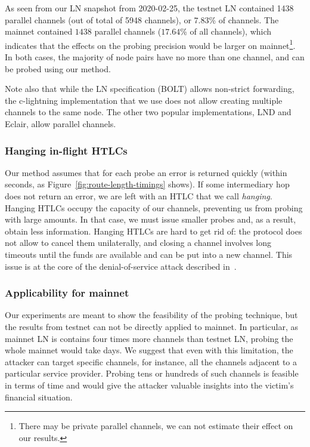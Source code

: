 As seen from our LN snapshot from 2020-02-25, the testnet LN contained 1438 parallel channels (out of total of 5948 channels), or $7.83$\% of channels.
The mainnet contained $1438$ parallel channels ($17.64$\% of all channels), which indicates that the effects on the probing precision would be larger on mainnet\footnote{There may be private parallel channels, we can not estimate their effect on our results.}.
In both cases, the majority of node pairs have no more than one channel, and can be probed using our method.

Note also that while the LN specification (BOLT) allows non-strict forwarding, the c-lightning implementation that we use does not allow creating multiple channels to the same node.
The other two popular implementations, LND and Eclair, allow parallel channels.

\subsubsection{Hanging in-flight HTLCs}

Our method assumes that for each probe an error is returned quickly (within seconds, as Figure~\ref{fig:route-length-timings} shows).
If some intermediary hop does not return an error, we are left with an HTLC that we call \textit{hanging}.
Hanging HTLCs occupy the capacity of our channels, preventing us from probing with large amounts.
In that case, we must issue smaller probes and, as a result, obtain less information.
Hanging HTLCs are hard to get rid of: the protocol does not allow to cancel them unilaterally, and closing a channel involves long timeouts until the funds are available and can be put into a new channel.
This issue is at the core of the denial-of-service attack described in~\cite{Mizrahi2020}.

\subsubsection{Applicability for mainnet}
Our experiments are meant to show the feasibility of the probing technique, but the results from testnet can not be directly applied to mainnet.
In particular, as mainnet LN is contains four times more channels than testnet LN, probing the whole mainnet would take days.
We suggest that even with this limitation, the attacker can target specific channels, for instance, all the channels adjacent to a particular service provider.
Probing tens or hundreds of such channels is feasible in terms of time and would give the attacker valuable insights into the victim's financial situation.

